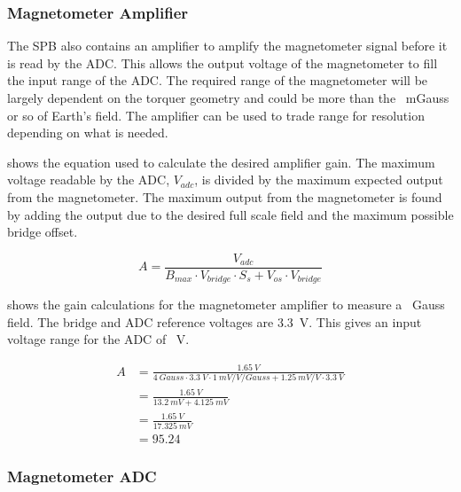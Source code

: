 \subsubsection{Magnetometer Amplifier}

The \ac{SPB} also contains an amplifier to amplify the magnetometer signal before it is read by the \ac{ADC}. This allows the output voltage of the magnetometer to fill the input range of the \ac{ADC}. The required range of the magnetometer will be largely dependent on the torquer geometry and could be more than the ~mGauss or so of Earth's field. The amplifier can be used to trade range for resolution depending on what is needed.

 shows the equation used to calculate the desired amplifier gain. The maximum voltage readable by the \ac{ADC}, $V_{adc}$, is divided by the maximum expected output from the magnetometer. The maximum output from the magnetometer is found by adding the output due to the desired full scale field and the maximum possible bridge offset.

\begin{equation}
    \label{eq:amp-gain}
    A = \frac{V_{adc}}{B_{max} \cdot V_{bridge} \cdot S_s + V_{os} \cdot V_{bridge}}
\end{equation}

 shows the gain calculations for the magnetometer amplifier to measure a ~Gauss field. The bridge and \ac{ADC} reference voltages are 3.3~V. This gives an input voltage range for the \ac{ADC} of ~V.

\begin{equation}
    \label{eq:amp-gain-calc}
    \begin{split}
        A &= \frac{1.65~\unit{V}}{4~\unit{Gauss} \cdot 3.3~\unit{V} \cdot 1~\unit{mV/V/Gauss} + 1.25~\unit{mV/V} \cdot 3.3~\unit{V}}\\ 
          &= \frac{1.65~\unit{V}}{13.2~\unit{mV} + 4.125~\unit{mV}} \\
          &= \frac{1.65~\unit{V}}{17.325~\unit{mV}} \\
          &= 95.24
    \end{split}
\end{equation}


\subsubsection{Magnetometer \acl*{ADC}}

